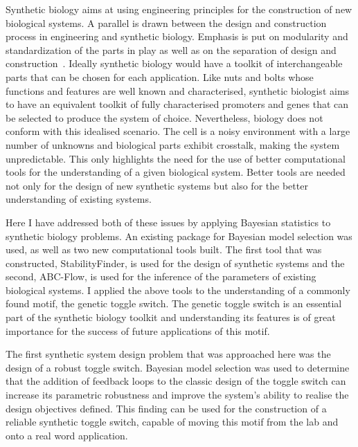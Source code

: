 




Synthetic biology aims at using engineering principles for the construction of new biological systems. A parallel is drawn between the design and construction process in engineering and synthetic biology. Emphasis is put on modularity and standardization of the parts in play as well as on the separation of design and construction~\autocite{Agapakis:2009bt}. Ideally synthetic biology would have a toolkit of interchangeable parts that can be chosen for each application. Like nuts and bolts whose functions and features are well known and characterised, synthetic biologist aims to have an equivalent toolkit of fully characterised promoters and genes that can be selected to produce the system of choice. Nevertheless, biology does not conform with this idealised scenario. The cell is a noisy environment with a large number of unknowns and biological parts exhibit crosstalk, making the system unpredictable. This only highlights the need for the use of better computational tools for the understanding of a given biological system. Better tools are needed not only for the design of new synthetic systems but also for the better understanding of existing systems.     

Here I have addressed both of these issues by applying Bayesian statistics to synthetic biology problems. An existing package for Bayesian model selection was used, as well as two new computational tools built. The first tool that was constructed, StabilityFinder, is used for the design of synthetic systems and the second, ABC-Flow, is used for the inference of the parameters of existing biological systems. I applied the above tools to the understanding of a commonly found motif, the genetic toggle switch. The genetic toggle switch is an essential part of the synthetic biology toolkit and understanding its features is of great importance for the success of future applications of this motif. 

The first synthetic system design problem that was approached here was the design of a robust toggle switch. Bayesian model selection was used to determine that the addition of feedback loops to the classic design of the toggle switch can increase its parametric robustness and improve the system's ability to realise the design objectives defined. This finding can be used for the construction of a reliable synthetic toggle switch, capable of moving this motif from the lab and onto a real word application.   

